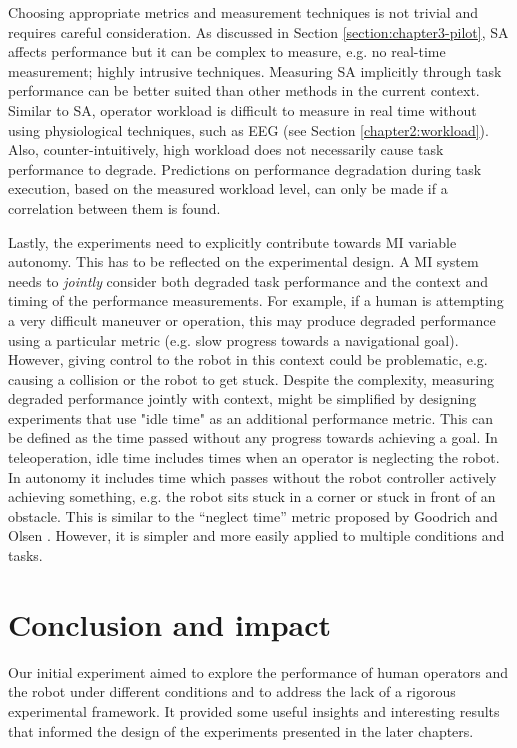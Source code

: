\documentclass[a4paper,12pt,oneside,openright]{bhamthesis}
\begin{document}
Choosing appropriate metrics and measurement techniques is not trivial and requires careful consideration. As discussed in Section \ref{section:chapter3-pilot}, SA affects performance but it can be complex to measure, e.g. no real-time measurement; highly intrusive techniques. Measuring SA implicitly through task performance can be better suited than other methods in the current context. Similar to SA, operator workload is difficult to measure in real time without using physiological techniques, such as EEG (see Section \ref{chapter2:workload}). Also, counter-intuitively, high workload does not necessarily cause task performance to degrade. Predictions on performance degradation during task execution, based on the measured workload level, can only be made if a correlation between them is found.

Lastly, the experiments need to explicitly contribute towards MI variable autonomy. This has to be reflected on the experimental design. A MI system needs to \emph{jointly} consider both degraded task performance and the context and timing of the performance measurements. For example, if a human is attempting a very difficult maneuver or operation, this may produce degraded performance using a particular metric (e.g. slow progress towards a navigational goal). However, giving control to the robot in this context could be problematic, e.g. causing a collision or the robot to get stuck. Despite the complexity, measuring degraded performance jointly with context, might be simplified by designing experiments that use "idle time" as an additional performance metric. This can be defined as the time passed without any progress towards achieving a goal. In teleoperation, idle time includes times when an operator is neglecting the robot. In autonomy it includes time which passes without the robot controller actively achieving something, e.g. the robot sits stuck in a corner or stuck in front of an obstacle. This is similar to the ``neglect time'' metric proposed by Goodrich and Olsen \citep{Goodrich2003}. However, it is simpler and more easily applied to multiple conditions and tasks.


\section{Conclusion and impact}
\label{chap3:conclusion}

Our initial experiment aimed to explore the performance of human operators and the robot under different conditions and to address the lack of a rigorous experimental framework. It provided some useful insights and interesting results that informed the design of the experiments presented in the later chapters. 
\end{document}
